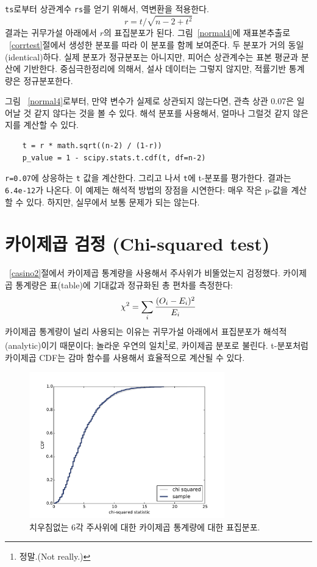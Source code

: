 {\tt ts}로부터 상관계수 {\tt rs}를 얻기 위해서, 역변환을 적용한다.
%
\[ r = t / \sqrt{n - 2 + t^2} \]
%
결과는 귀무가설 아래에서 $r$의 표집분포가 된다.
그림~\ref{normal4}에 재표본추출로 ~\ref{corrtest}절에서 생성한 분포를 따라 이 분포를 함께 보여준다.
두 분포가 거의 동일(identical)하다. 실제 분포가 정규분포는 아니지만, 피어슨 상관계수는 표본 평균과 분산에 기반한다. 중심극한정리에 의해서, 설사 데이터는 그렇지 않지만, 적률기반 통계량은 정규분포한다.


그림 ~\ref{normal4}로부터, 만약 변수가 실제로 상관되지 않는다면, 관측 상관 0.07은 일어날 것 같지 않다는 것을 볼 수 있다. 해석 분포를 사용해서, 얼마나 그럴것 같지 않은지를 계산할 수 있다.

\begin{verbatim}
    t = r * math.sqrt((n-2) / (1-r))
    p_value = 1 - scipy.stats.t.cdf(t, df=n-2)
\end{verbatim}

{\tt r=0.07}에 상응하는 {\tt t} 값을 계산한다. 그리고 나서 {\tt t}에 t-분포를 평가한다. 결과는 {\tt 6.4e-12}가 나온다.
이 예제는 해석적 방법의 장점을 시연한다: 매우 작은 p-값을 계산할 수 있다. 하지만, 실무에서 보통 문제가 되는 않는다.


\section{카이제곱 검정 (Chi-squared test)}

~\ref{casino2}절에서 카이제곱 통계량을 사용해서 주사위가 비뚤었는지 검정했다. 카이제곱 통계량은 표(table)에 기대값과 정규화된 총 편차를 측정한다:
%
\[ \chi^2 = \sum_i \frac{(O_i - E_i)^2}{E_i} \]
%
카이제곱 통계량이 널리 사용되는 이유는 귀무가설 아래에서 표집분포가 해석적(analytic)이기 때문이다; 놀라운 우연의 일치\footnote{정말.(Not really.)}로, 카이제곱 분포로 불린다.
t-분포처럼 카이제곱 CDF는 감마 함수를 사용해서 효율적으로 계산될 수 있다.

\begin{figure}
\centerline{\includegraphics[height=2.5in]{figs/normal5.pdf}}
\caption{치우침없는 6각 주사위에 대한 카이제곱 통계량에 대한 표집분포.}
\label{normal5}
\end{figure}

